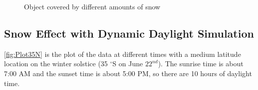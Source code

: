 \documentclass{article}
\begin{document}
\begin{figure}[h]
  \centering
  \hfill
  \hfill
  \caption{Object covered by different amounts of snow}
  \label{fig:9}
\end{figure}

\subsection {Snow Effect with Dynamic Daylight Simulation}

\ref{fig:Plot35N} is the plot of the data at different times with a medium latitude location on the winter 
solstice (35 $^{\circ}$S on June \(22^{nd}\)). The sunrise time is about 7:00 AM and the sunset time is about 
5:00 PM, so there are 10 hours of daylight time.
\end{document}

